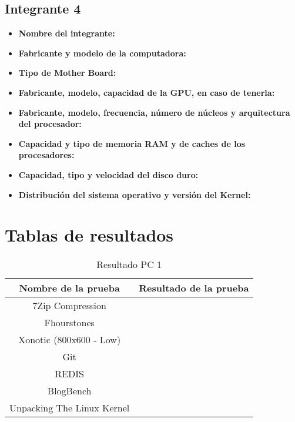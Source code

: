 \documentclass[12pt]{article}
\newcommand{\pl}[1]{\item \textbf{ #1 }}
\begin{document}
\subsection{Integrante 4}
\begin{itemize}
    \pl{Nombre del integrante:}

    \pl{Fabricante y modelo de la computadora:}

    \pl{Tipo de Mother Board:}

    \pl{Fabricante, modelo, capacidad de la GPU, en caso de tenerla:}

    \pl{Fabricante, modelo, frecuencia, número de núcleos y arquitectura del procesador:}

    \pl{Capacidad y tipo de memoria RAM y de caches de los procesadores:}

    \pl{Capacidad, tipo y velocidad del disco duro:}

    \pl{Distribución del sistema operativo y versión del Kernel:}
\end{itemize}

\newpage
\section{Tablas de resultados}

\begin{table}[!htb]
    \centering
    \begin{tabular}{|c|c|}
        \hline
        \textbf{Nombre de la prueba} & \textbf{Resultado de la prueba}\\
        \hline
        7Zip Compression &  \\
        \hline
        Fhourstones &  \\
        \hline
        Xonotic (800x600 - Low) &  \\
        \hline
        Git &  \\
        \hline
        REDIS &  \\
        \hline
        BlogBench &  \\
        \hline
        Unpacking The Linux Kernel &  \\
        \hline
    \end{tabular}
    \caption{Resultado PC 1}
\end{table}
\end{document}
